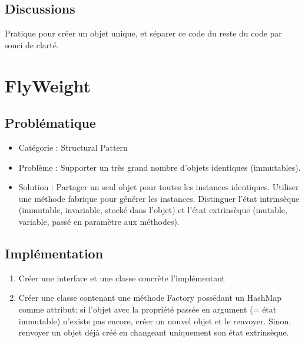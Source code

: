 \subsection{Discussions}
Pratique pour créer un objet unique, et séparer ce code du reste du code par souci de clarté.











\section{FlyWeight }
\subsection{Problématique}
\begin{itemize}
    \item Catégorie : Structural Pattern
    \item Problème : Supporter un très grand nombre d'objets identiques (immutables). 
    \item Solution : Partager un seul objet pour toutes les instances identiques. Utiliser une méthode fabrique pour générer les instances. Distinguer l'état intrinsèque (immutable, invariable, stocké dans l'objet) et l'état extrinsèque (mutable, variable, passé en paramètre aux méthodes). 
\end{itemize}
\subsection{Implémentation}
\begin{enumerate}
    \item Créer une interface et une classe concrète l'implémentant 
    \item Créer une classe contenant une méthode Factory possédant un HashMap comme attribut: si l’objet avec la propriété passée en argument (= état immutable) n’existe pas encore, créer un nouvel objet et le renvoyer. Sinon, renvoyer un objet déjà créé en changeant uniquement son état extrinsèque.

\end{enumerate}

